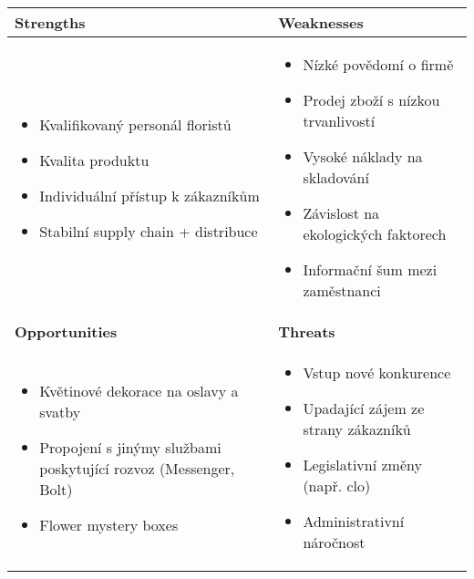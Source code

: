 \documentclass{article}
\begin{document}
\begin{table*}[h]
    \begin{tabular}{|p{195pt}|p{195pt}|}
        \hline \bfseries Strengths &\bfseries Weaknesses  \\
        \hline
        {\begin{itemize}
            \item Kvalifikovaný personál floristů
            \item Kvalita produktu
            \item Individuální přístup k zákazníkům
            \item Stabilní supply chain + distribuce
        \end{itemize}}
        &
        {\begin{itemize}
            \item Nízké povědomí o firmě
            \item Prodej zboží s nízkou trvanlivostí
            \item Vysoké náklady na skladování
            \item Závislost na ekologických faktorech
            \item Informační šum mezi zaměstnanci
        \end{itemize}} \\
        \hline \bfseries Opportunities &\bfseries Threats  \\
        \hline
        {\begin{itemize}
            \item Květinové dekorace na oslavy a svatby
            \item Propojení s jinýmy službami poskytující rozvoz (Messenger, Bolt)
            \item Flower mystery boxes
        \end{itemize}} &
        {\begin{itemize}
            \item Vstup nové konkurence
            \item Upadající zájem ze strany zákazníků
            \item Legislativní změny (např. clo)
            \item Administrativní náročnost
        \end{itemize}} \\
        \hline
    \end{tabular}
\end{table*}
\end{document}
